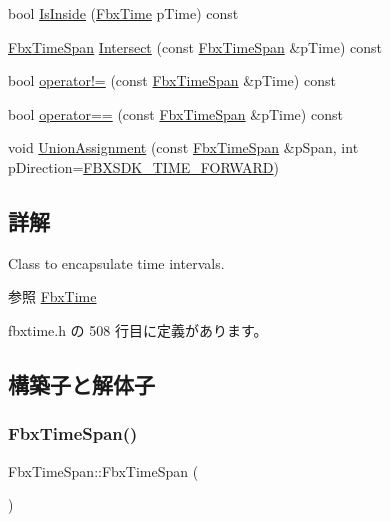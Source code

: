 \begin{DoxyCompactItemize}
\item 
bool \hyperlink{class_fbx_time_span_a969295da345c8c9e574acbbcda1d59e0}{Is\+Inside} (\hyperlink{class_fbx_time}{Fbx\+Time} p\+Time) const
\item 
\hyperlink{class_fbx_time_span}{Fbx\+Time\+Span} \hyperlink{class_fbx_time_span_a8be395bd3e5dfbdcd2bc1551832e04b1}{Intersect} (const \hyperlink{class_fbx_time_span}{Fbx\+Time\+Span} \&p\+Time) const
\item 
bool \hyperlink{class_fbx_time_span_a2dd0bd644b3c8eb5fb79cc2866ea0420}{operator!=} (const \hyperlink{class_fbx_time_span}{Fbx\+Time\+Span} \&p\+Time) const
\item 
bool \hyperlink{class_fbx_time_span_a1dac810b3c1c123bd3055befb96e42f7}{operator==} (const \hyperlink{class_fbx_time_span}{Fbx\+Time\+Span} \&p\+Time) const
\item 
void \hyperlink{class_fbx_time_span_af5159fe30c3baa37728c12ac167a28ba}{Union\+Assignment} (const \hyperlink{class_fbx_time_span}{Fbx\+Time\+Span} \&p\+Span, int p\+Direction=\hyperlink{fbxtime_8h_aa80e034e7196b05b47f7bc58a5e2ce49}{F\+B\+X\+S\+D\+K\+\_\+\+T\+I\+M\+E\+\_\+\+F\+O\+R\+W\+A\+RD})
\end{DoxyCompactItemize}


\subsection{詳解}
Class to encapsulate time intervals.

\begin{DoxySeeAlso}{参照}
\hyperlink{class_fbx_time}{Fbx\+Time} 
\end{DoxySeeAlso}


 fbxtime.\+h の 508 行目に定義があります。



\subsection{構築子と解体子}
\mbox{\label{class_fbx_time_span_a4eed31104b9afeb2b1a53bd7b2b1f823}} 
\subsubsection{\texorpdfstring{Fbx\+Time\+Span()}{FbxTimeSpan()}\hspace{0.1cm}{\footnotesize\ttfamily [1/2]}}
{\footnotesize\ttfamily Fbx\+Time\+Span\+::\+Fbx\+Time\+Span (\begin{DoxyParamCaption}{ }\end{DoxyParamCaption})\hspace{0.3cm}{\ttfamily [inline]}}



